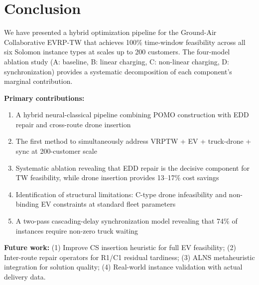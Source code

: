 \documentclass[11pt,a4paper]{article}
\begin{document}
\section{Conclusion}

We have presented a hybrid optimization pipeline for the Ground-Air Collaborative
EVRP-TW that achieves 100\% time-window feasibility across all six Solomon instance
types at scales up to 200 customers. The four-model ablation study (A: baseline,
B: linear charging, C: non-linear charging, D: synchronization) provides a systematic
decomposition of each component's marginal contribution.

\textbf{Primary contributions:}
\begin{enumerate}
    \item A hybrid neural-classical pipeline combining POMO construction with
          EDD repair and cross-route drone insertion
    \item The first method to simultaneously address VRPTW + EV + truck-drone + sync
          at 200-customer scale
    \item Systematic ablation revealing that EDD repair is the decisive component
          for TW feasibility, while drone insertion provides 13--17\% cost savings
    \item Identification of structural limitations: C-type drone infeasibility
          and non-binding EV constraints at standard fleet parameters
    \item A two-pass cascading-delay synchronization model revealing that 74\% of
          instances require non-zero truck waiting
\end{enumerate}

\textbf{Future work:} (1) Improve CS insertion heuristic for full EV feasibility;
(2) Inter-route repair operators for R1/C1 residual tardiness;
(3) ALNS metaheuristic integration for solution quality;
(4) Real-world instance validation with actual delivery data.
\end{document}
